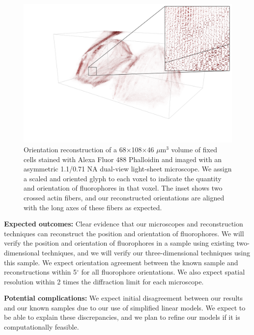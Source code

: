 \documentclass[11pt]{article}
\begin{document}
\begin{figure}[t]
  \begin{minipage}[c]{0.7\textwidth}
    \includegraphics[width=\textwidth, trim={3em 0em 0em 0em}]{figs/inset}
  \end{minipage}\hfill
  \begin{minipage}[c]{0.25\textwidth}
    \vspace{-1em}
    \caption{Orientation reconstruction of a 68$\times$108$\times$46 $\mu$m${}^3$
    volume of fixed cells stained with Alexa Fluor 488 Phalloidin and imaged
    with an asymmetric 1.1/0.71 NA dual-view light-sheet microscope. We assign a
    scaled and oriented glyph to each voxel to indicate the quantity and
    orientation of fluorophores in that voxel. The inset shows two crossed actin
    fibers, and our reconstructed orientations are aligned with the long axes of these
    fibers as expected.
    } \label{fig:recon}
  \end{minipage}
\vspace{-5em}  
\end{figure}

\noindent\textbf{Expected outcomes:} Clear evidence that our microscopes and
reconstruction techniques can reconstruct the position and orientation of
fluorophores. We will verify the position and orientation of fluorophores in a
sample using existing two-dimensional techniques, and we will verify our
three-dimensional techniques using this sample. We expect orientation agreement
between the known sample and reconstructions within 5$^{\circ}$ for all
fluorophore orientations. We also expect spatial resolution within 2 times the
diffraction limit for each microscope.

\noindent\textbf{Potential complications:} We expect initial disagreement
between our results and our known samples due to our use of simplified linear
models. We expect to be able to explain these discrepancies, and we plan to
refine our models if it is computationally feasible.
\end{document}
